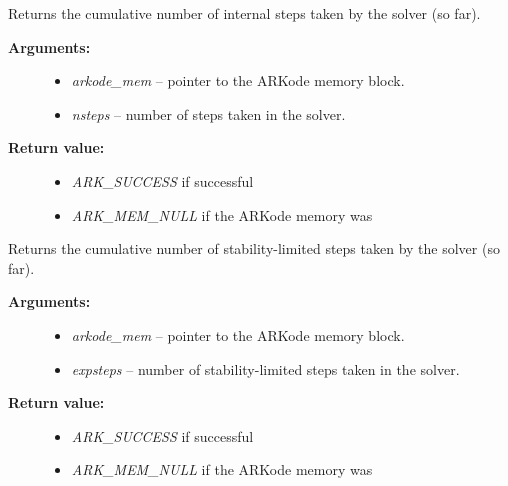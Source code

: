 \documentclass[letterpaper,10pt,english]{sphinxmanual}
\begin{document}
\begin{fulllineitems}
\label{c_interface/User_callable:ARKodeGetNumSteps}
Returns the cumulative number of internal steps taken by
the solver (so far).
\begin{description}
\item[{\textbf{Arguments:}}] \leavevmode\begin{itemize}
\item {} 
\emph{arkode\_mem} -- pointer to the ARKode memory block.

\item {} 
\emph{nsteps} -- number of steps taken in the solver.

\end{itemize}

\item[{\textbf{Return value:}}] \leavevmode\begin{itemize}
\item {} 
\emph{ARK\_SUCCESS} if successful

\item {} 
\emph{ARK\_MEM\_NULL} if the ARKode memory was 

\end{itemize}

\end{description}

\end{fulllineitems}


\begin{fulllineitems}
\label{c_interface/User_callable:ARKodeGetNumExpSteps}
Returns the cumulative number of stability-limited steps
taken by the solver (so far).
\begin{description}
\item[{\textbf{Arguments:}}] \leavevmode\begin{itemize}
\item {} 
\emph{arkode\_mem} -- pointer to the ARKode memory block.

\item {} 
\emph{expsteps} -- number of stability-limited steps taken in the solver.

\end{itemize}

\item[{\textbf{Return value:}}] \leavevmode\begin{itemize}
\item {} 
\emph{ARK\_SUCCESS} if successful

\item {} 
\emph{ARK\_MEM\_NULL} if the ARKode memory was 

\end{itemize}

\end{description}

\end{fulllineitems}
\end{document}
